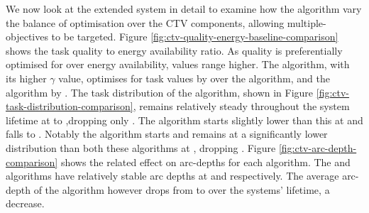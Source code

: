 We now look at the extended system in detail to examine how the algorithm vary the balance  of optimisation over the CTV components, allowing multiple-objectives to be targeted. Figure 	\ref{fig:ctv-quality-energy-baseline-comparison} shows the task quality to energy availability ratio. 
As quality is preferentially optimised for over energy availability, values range higher. The \algorithmQuality{}{} algorithm, with its higher $\gamma$ value, optimises for task values by \resultsQEQualityEnd{}{} over the \algorithmEnergy{}{} algorithm, and the \algorithmDistribution{}{} algorithm by \resultsQEDistDiff{}{}. The task distribution of the \algorithmDistribution{}{} algorithm, shown in Figure 	\ref{fig:ctv-task-distribution-comparison}, remains relatively steady throughout the system lifetime at \resultsTaskDistDistStart{}{} to \resultsTaskDistDistEnd{}{},dropping only \resultsTaskDistDistPercent{}{}. The \algorithmQuality{}{} algorithm starts slightly lower than this at \resultsTaskDistQualityStart{}{} and falls \resultsTaskDistQualityPercent{}{} to \resultsTaskDistQualityEnd{}{}. Notably the \algorithmEnergy{}{} algorithm starts and remains at a significantly lower distribution than both these algorithms at \resultsTaskDistEnergyEnd{}{}, dropping \resultsTaskDistEnergydPercent{}{}. Figure
\ref{fig:ctv-arc-depth-comparison} shows the related effect on arc-depths for each algorithm. The \algorithmQuality{}{} and \algorithmDistribution{}{} algorithms have relatively stable arc depths at \resultsArcDepthQualityEnd{}{} and \resultsArcDepthDistEnd{}{} respectively. The average arc-depth of the \algorithmEnergy{}{} algorithm however drops from \resultsArcDepthEnergyStart{}{} to  \resultsArcDepthEnergyEnd{}{} over the systems' lifetime, a \resultsArcDepthEnergyPercent{}{} decrease.

